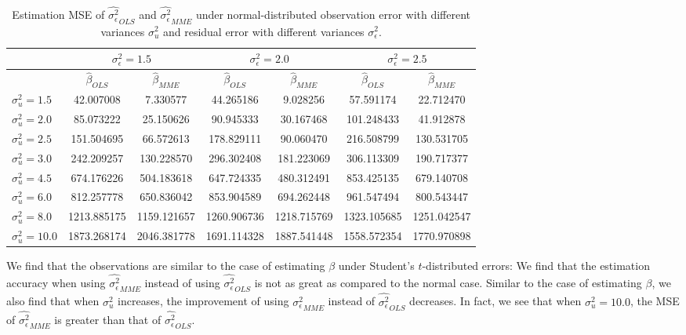 \documentclass{article}
\begin{document}
\begin{table}[ht]
    \centering
    \caption{Estimation MSE of $\hat{\sigma^2_\epsilon}_{OLS}$ and $\hat{\sigma^2_\epsilon}_{MME}$ under normal-distributed observation error with different variances $\sigma^2_u$ and residual error with different variances $\sigma^2_\epsilon$.}
    \label{Tab:MSE_sigma_t}
    \begin{tabular}[t]{lcccccc}
        \hline
        &\multicolumn{2}{c}{$\sigma^2_\epsilon=1.5$}&\multicolumn{2}{c}{$\sigma^2_\epsilon=2.0$}&\multicolumn{2}{c}{$\sigma^2_\epsilon=2.5$}\\
        \hline
        &$\hat{\beta}_{OLS}$&$\hat{\beta}_{MME}$&$\hat{\beta}_{OLS}$&$\hat{\beta}_{MME}$&$\hat{\beta}_{OLS}$&$\hat{\beta}_{MME}$\\
        \hline
        $\sigma^2_u = 1.5$&42.007008&7.330577&44.265186&9.028256&57.591174&22.712470\\
        $\sigma^2_u = 2.0$&85.073222&25.150626&90.945333&30.167468&101.248433&41.912878\\
        $\sigma^2_u = 2.5$&151.504695&66.572613&178.829111&90.060470&216.508799&130.531705\\
        $\sigma^2_u = 3.0$&242.209257&130.228570&296.302408&181.223069&306.113309&190.717377\\
        $\sigma^2_u = 4.5$&674.176226&504.183618&647.724335&480.312491&853.425135&679.140708\\
        $\sigma^2_u = 6.0$&812.257778&650.836042&853.904589&694.262448&961.547494&800.543447\\
        $\sigma^2_u = 8.0$&1213.885175&1159.121657&1260.906736&1218.715769&1323.105685&1251.042547\\
        $\sigma^2_u = 10.0$&1873.268174&2046.381778&1691.114328&1887.541448&1558.572354&1770.970898\\
    \end{tabular}
\end{table}

We find that the observations are similar to the case of estimating $\beta$ under Student's $t$-distributed errors: 
We find that the estimation accuracy when using $\hat{\sigma^2_\epsilon}_{MME}$ instead of using $\hat{\sigma^2_\epsilon}_{OLS}$ is not as great as compared to the normal case.
Similar to the case of estimating $\beta$, we also find that when $\sigma^2_u$ increases, the improvement of using $\hat{\sigma^2_\epsilon}_{MME}$ instead of $\hat{\sigma^2_\epsilon}_{OLS}$ decreases.
In fact, we see that when $\sigma^2_u = 10.0$, the MSE of $\hat{\sigma^2_\epsilon}_{MME}$ is greater than that of $\hat{\sigma^2_\epsilon}_{OLS}$. 
\end{document}
